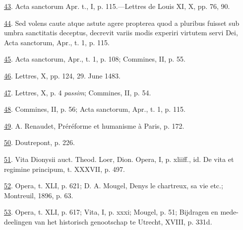 \protect\hypertarget{23_NOTES.xhtmlux5cux23id_940}{\protect\hyperlink{14_Chapter_Seven__THE_PIOUS_PERSONA.xhtmlux5cux23id_939}{43}}.
Acta sanctorum Apr. t., I, p. 115.---Lettres de Louis XI, X, pp. 76, 90.

\protect\hypertarget{23_NOTES.xhtmlux5cux23id_938}{\protect\hyperlink{14_Chapter_Seven__THE_PIOUS_PERSONA.xhtmlux5cux23id_937}{44}}.
Sed volens caute atque astute agere propterea quod a pluribus fuisset
sub umbra sanctitatis deceptus, decrevit variis modis experiri virtutem
servi Dei, Acta sanctorum, Apr., t. 1, p. 115.

\protect\hypertarget{23_NOTES.xhtmlux5cux23id_936}{\protect\hyperlink{14_Chapter_Seven__THE_PIOUS_PERSONA.xhtmlux5cux23id_935}{45}}.
Acta sanctorum, Apr., t. 1, p. 108; Commines, II, p. 55.

\protect\hypertarget{23_NOTES.xhtmlux5cux23id_934}{\protect\hyperlink{14_Chapter_Seven__THE_PIOUS_PERSONA.xhtmlux5cux23id_933}{46}}.
Lettres, X, pp. 124, 29. June 1483.

\protect\hypertarget{23_NOTES.xhtmlux5cux23id_932}{\protect\hyperlink{14_Chapter_Seven__THE_PIOUS_PERSONA.xhtmlux5cux23id_931}{47}}.
Lettres, X, p. 4 \emph{passim}; Commines, II, p. 54.

\protect\hypertarget{23_NOTES.xhtmlux5cux23id_930}{\protect\hyperlink{14_Chapter_Seven__THE_PIOUS_PERSONA.xhtmlux5cux23id_929}{48}}.
Commines, II, p. 56; Acta sanctorum, Apr., t. 1, p. 115.

\protect\hypertarget{23_NOTES.xhtmlux5cux23id_928}{\protect\hyperlink{14_Chapter_Seven__THE_PIOUS_PERSONA.xhtmlux5cux23id_927}{49}}.
A. Renaudet, Préréforme et humanisme à Paris, p. 172.

\protect\hypertarget{23_NOTES.xhtmlux5cux23id_926}{\protect\hyperlink{14_Chapter_Seven__THE_PIOUS_PERSONA.xhtmlux5cux23id_925}{50}}.
Doutrepont, p. 226.

\protect\hypertarget{23_NOTES.xhtmlux5cux23id_924}{\protect\hyperlink{14_Chapter_Seven__THE_PIOUS_PERSONA.xhtmlux5cux23id_923}{51}}.
Vita Dionysii auct. Theod. Loer, Dion. Opera, I, p. xliiff., id. De vita
et regimine principum, t. XXXVII, p. 497.

\protect\hypertarget{23_NOTES.xhtmlux5cux23id_922}{\protect\hyperlink{14_Chapter_Seven__THE_PIOUS_PERSONA.xhtmlux5cux23id_921}{52}}.
Opera, t. XLI, p. 621; D. A. Mougel, Denys le chartreux, sa vie etc.;
Montreuil, 1896, p. 63.

\protect\hypertarget{23_NOTES.xhtmlux5cux23id_920}{\protect\hyperlink{14_Chapter_Seven__THE_PIOUS_PERSONA.xhtmlux5cux23id_919}{53}}.
Opera, t. XLI, p. 617; Vita, I, p. xxxi; Mougel, p. 51; Bijdragen en
mede-deelingen van het historisch genootschap te Utrecht, XVIII, p.
331d.

